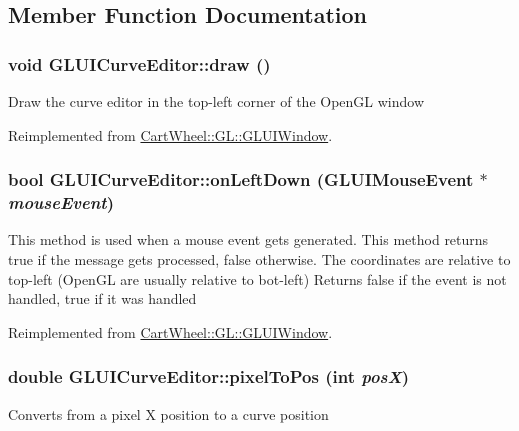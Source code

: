 \subsection{Member Function Documentation}
\hypertarget{classCartWheel_1_1GL_1_1GLUICurveEditor_a04fa21f1c1f1c98e15f66da16b7f1b90}{
\subsubsection[{draw}]{\setlength{\rightskip}{0pt plus 5cm}void GLUICurveEditor::draw ()}}
\label{classCartWheel_1_1GL_1_1GLUICurveEditor_a04fa21f1c1f1c98e15f66da16b7f1b90}
Draw the curve editor in the top-\/left corner of the OpenGL window 

Reimplemented from \hyperlink{classCartWheel_1_1GL_1_1GLUIWindow}{CartWheel::GL::GLUIWindow}.

\hypertarget{classCartWheel_1_1GL_1_1GLUICurveEditor_aba5a6d783d673d4a6e2ba0c2b305b2d8}{
\subsubsection[{onLeftDown}]{\setlength{\rightskip}{0pt plus 5cm}bool GLUICurveEditor::onLeftDown ({\bf GLUIMouseEvent} $\ast$ {\em mouseEvent})}}
\label{classCartWheel_1_1GL_1_1GLUICurveEditor_aba5a6d783d673d4a6e2ba0c2b305b2d8}
This method is used when a mouse event gets generated. This method returns true if the message gets processed, false otherwise. The coordinates are relative to top-\/left (OpenGL are usually relative to bot-\/left) Returns false if the event is not handled, true if it was handled 

Reimplemented from \hyperlink{classCartWheel_1_1GL_1_1GLUIWindow}{CartWheel::GL::GLUIWindow}.

\hypertarget{classCartWheel_1_1GL_1_1GLUICurveEditor_a39b716a822a250d5d1376e0df9ef4066}{
\subsubsection[{pixelToPos}]{\setlength{\rightskip}{0pt plus 5cm}double GLUICurveEditor::pixelToPos (int {\em posX})}}
\label{classCartWheel_1_1GL_1_1GLUICurveEditor_a39b716a822a250d5d1376e0df9ef4066}
Converts from a pixel X position to a curve position

